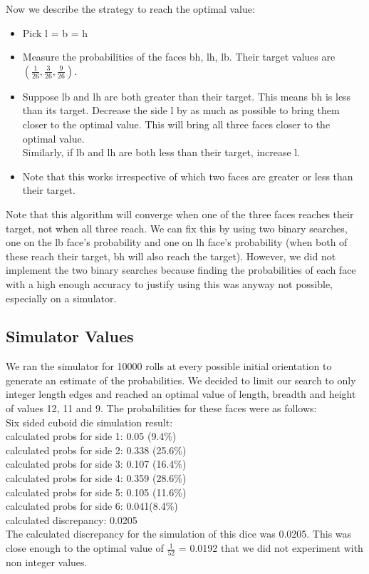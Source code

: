Now we describe the strategy to reach the optimal value:\\
\begin{itemize}
    \item Pick l = b = h\\
    \item Measure the probabilities of the faces bh, lh, lb. Their target values are $(\frac{1}{26}, \frac{3}{26}, \frac{9}{26})$.\\
    \item Suppose lb and lh are both greater than their target. This means bh is less than its target. Decrease the side l by as much as possible to bring them closer to the optimal value. This will bring all three faces closer to the optimal value.\\
    Similarly, if lb and lh are both less than their target, increase l.\\
    \item Note that this works irrespective of which two faces are greater or less than their target.\\
    
\end{itemize}

Note that this algorithm will converge when one of the three faces reaches their target, not when all three reach. We can fix this by using two binary searches, one on the lb face's probability and one on lh face's probability (when both of these reach their target, bh will also reach the target). However, we did not implement the two binary searches because finding the probabilities of each face with a high enough accuracy to justify using this was anyway not possible, especially on a simulator.\\

\subsection{Simulator Values}
We ran the simulator for 10000 rolls at every possible initial orientation to generate an estimate of the probabilities. We decided to limit our search to only integer length edges and reached an optimal value of length, breadth and height of values 12, 11 and 9. The probabilities for these faces were as follows:\\
Six sided cuboid die simulation result:\\
calculated probs for side 1: 0.05 (9.4\%)\\
calculated probs for side 2: 0.338 (25.6\%)\\
calculated probs for side 3: 0.107 (16.4\%)\\
calculated probs for side 4: 0.359 (28.6\%)\\
calculated probs for side 5: 0.105 (11.6\%)\\
calculated probs for side 6: 0.041(8.4\%)\\
calculated discrepancy: 0.0205\\
The calculated discrepancy for the simulation of this dice was 0.0205. This was close enough to the optimal value of $\frac{1}{52}$ = 0.0192 that we did not experiment with non integer values.\\

